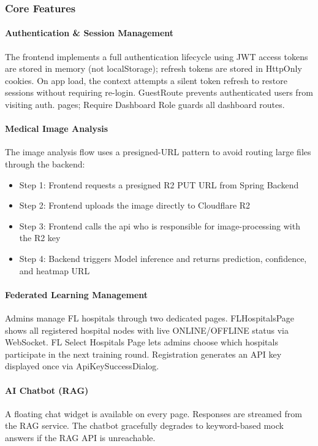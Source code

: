 \subsubsection{Core Features}
\paragraph{Authentication \& Session Management}
The frontend implements a full authentication lifecycle using JWT access tokens are stored in memory (not localStorage); refresh tokens are stored in HttpOnly cookies. On app load, the context attempts a silent token refresh to restore sessions without requiring re-login. GuestRoute prevents authenticated users from visiting auth. pages; Require Dashboard Role guards all dashboard routes.

\paragraph{Medical Image Analysis}
The image analysis flow uses a presigned-URL pattern to avoid routing large files through the backend:
\begin{itemize}
	\item Step 1: Frontend requests a presigned R2 PUT URL from Spring Backend 
	\item Step 2: Frontend uploads the image directly to Cloudflare R2
	\item Step 3: Frontend calls the api who is responsible for image-processing with the R2 key
	\item Step 4: Backend triggers Model inference and returns prediction, confidence, and heatmap URL
\end{itemize}

\paragraph{Federated Learning Management}
Admins manage FL hospitals through two dedicated pages. FLHospitalsPage shows all registered hospital nodes with live ONLINE/OFFLINE status via WebSocket. FL Select Hospitals Page lets admins choose which hospitals participate in the next training round. Registration generates an API key displayed once via ApiKeySuccessDialog.

\paragraph{AI Chatbot (RAG)}
A floating chat widget  is available on every page. Responses are streamed from the RAG service. The chatbot gracefully degrades to keyword-based mock answers if the RAG API is unreachable.

